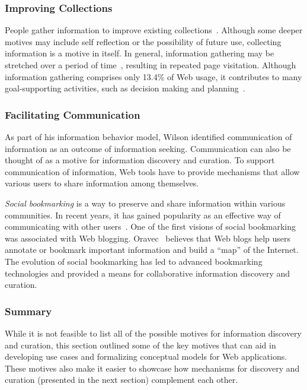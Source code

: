 \documentclass{sigchi}
\begin{document}
{{\subsubsection{Improving Collections}
People gather information to improve existing collections~\cite{lindley2012s}. Although some deeper motives may include self reflection or the possibility of future use, collecting information is a motive in itself. In general, information gathering may be stretched over a period of time~\cite{kellar2006goal}, resulting in repeated page visitation. Although information gathering comprises only 13.4\% of Web usage, it contributes to many goal-supporting activities, such as decision making and planning~\cite{kellar2006goal}.

}

{\subsubsection{Facilitating Communication}
As part of his information behavior model, Wilson identified communication of information as an outcome of information seeking. Communication can also be thought of as a motive for information discovery and curation. To support communication of information, Web tools have to provide mechanisms that allow various users to share information among themselves. 

\textit{Social bookmarking} is a way to preserve and share information within various communities. In recent years, it has gained popularity as an effective way of communicating with other users~\cite{estelles2010social}. One of the first visions of social bookmarking was associated with Web blogging. Oravec~\cite{oravec2002bookmarking} believes that Web blogs help users annotate or bookmark important information and build a ``map'' of the Internet. The evolution of social bookmarking has led to advanced bookmarking technologies and provided a means for collaborative information discovery and curation. 
}
{\subsubsection{Summary}
While it is not feasible to list all of the possible motives for information discovery and curation, this section outlined some of the key motives that can aid in developing use cases and formalizing conceptual models for Web applications. These motives also make it easier to showcase how mechanisms for discovery and curation (presented in the next section) complement each other.
} 
}
\end{document}
